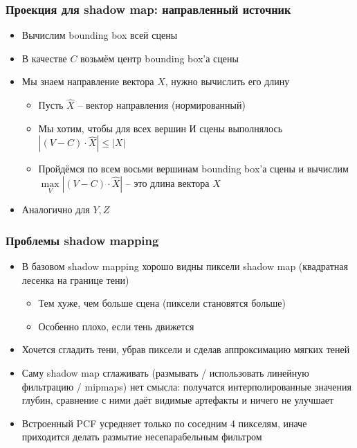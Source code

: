 \documentclass{beamer}
\begin{document}
\begin{frame}[fragile]
\frametitle{Проекция для shadow map: направленный источник}
\begin{itemize}
\item Вычислим bounding box всей сцены
\pause
\item В качестве \begin{math}C\end{math} возьмём центр bounding box'а сцены
\pause
\item Мы знаем направление вектора \begin{math}X\end{math}, нужно вычислить его длину
\begin{itemize}
\item Пусть \begin{math}\hat X\end{math} -- вектор направления (нормированный)
\item Мы хотим, чтобы для всех вершин \begin{math}И\end{math} сцены выполнялось \begin{math}|(V - C) \cdot \hat X| \leq |X|\end{math}
\pause
\item Пройдёмся по всем восьми вершинам bounding box'а сцены и вычислим \begin{math}\max\limits_V |(V - C) \cdot \hat X|\end{math} -- это длина вектора \begin{math}X\end{math}
\end{itemize}
\pause
\item Аналогично для \begin{math}Y, Z\end{math}
\end{itemize}
\end{frame}

\begin{frame}[fragile]
\frametitle{Проблемы shadow mapping}
\begin{itemize}
\item В базовом shadow mapping хорошо видны пиксели shadow map (квадратная лесенка на границе тени)
\pause
\begin{itemize}
\item Тем хуже, чем больше сцена (пиксели становятся больше)
\item Особенно плохо, если тень движется
\end{itemize}
\pause
\item Хочется сгладить тени, убрав пиксели и сделав аппроксимацию мягких теней
\pause
\item Саму shadow map сглаживать (размывать / использовать линейную фильтрацию / mipmaps) нет смысла: получатся интерполированные значения глубин, сравнение с ними даёт видимые артефакты и ничего не улучшает
\pause
\item Встроенный PCF усредняет только по соседним 4 пикселям, иначе приходится делать размытие несепарабельным фильтром
\end{itemize}
\end{frame}
\end{document}

